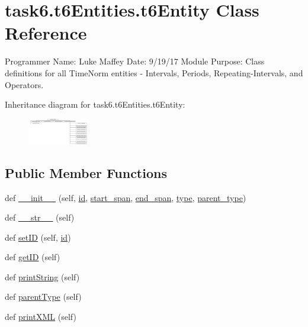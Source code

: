 \hypertarget{classtask6_1_1t6Entities_1_1t6Entity}{}\section{task6.\+t6\+Entities.\+t6\+Entity Class Reference}
\label{classtask6_1_1t6Entities_1_1t6Entity}


Programmer Name\+: Luke Maffey Date\+: 9/19/17 Module Purpose\+: Class definitions for all Time\+Norm entities -\/ Intervals, Periods, Repeating-\/\+Intervals, and Operators.  


Inheritance diagram for task6.\+t6\+Entities.\+t6\+Entity\+:\begin{figure}[H]
\begin{center}
\leavevmode
\includegraphics[height=1.138211cm]{classtask6_1_1t6Entities_1_1t6Entity}
\end{center}
\end{figure}
\subsection*{Public Member Functions}
\begin{DoxyCompactItemize}
\item 
def \hyperlink{classtask6_1_1t6Entities_1_1t6Entity_ac0bcf8dbefa28c8e1a77d891e368c9e1}{\+\_\+\+\_\+init\+\_\+\+\_\+} (self, \hyperlink{classtask6_1_1t6Entities_1_1t6Entity_a96b2e7fb553c920ab2db6f6deb31e3b4}{id}, \hyperlink{classtask6_1_1t6Entities_1_1t6Entity_a8221c36d2995a24200cdfbd74cc9233c}{start\+\_\+span}, \hyperlink{classtask6_1_1t6Entities_1_1t6Entity_a597d42bb02fc9f42277098f0ce21917c}{end\+\_\+span}, \hyperlink{classtask6_1_1t6Entities_1_1t6Entity_af0496eb852234bb168ab22d031c99ed3}{type}, \hyperlink{classtask6_1_1t6Entities_1_1t6Entity_a18ba365facb8cb062830abb11cf741f6}{parent\+\_\+type})
\item 
def \hyperlink{classtask6_1_1t6Entities_1_1t6Entity_a60cd3a7b64d13bbacb877267fa0151fe}{\+\_\+\+\_\+str\+\_\+\+\_\+} (self)
\item 
def \hyperlink{classtask6_1_1t6Entities_1_1t6Entity_a5387d85b2aa40e213b9962470207bd09}{set\+ID} (self, \hyperlink{classtask6_1_1t6Entities_1_1t6Entity_a96b2e7fb553c920ab2db6f6deb31e3b4}{id})
\item 
def \hyperlink{classtask6_1_1t6Entities_1_1t6Entity_aadb42e2b65a301043fb6162e4f14edd7}{get\+ID} (self)
\item 
def \hyperlink{classtask6_1_1t6Entities_1_1t6Entity_ae24a589eee8e89e5cc9d2116a05f574c}{print\+String} (self)
\item 
def \hyperlink{classtask6_1_1t6Entities_1_1t6Entity_ad72f67fab17e07055b34d77834174f75}{parent\+Type} (self)
\item 
def \hyperlink{classtask6_1_1t6Entities_1_1t6Entity_acd1af6b899f68fec07c9749e5d0129fa}{print\+X\+ML} (self)
\end{DoxyCompactItemize}
